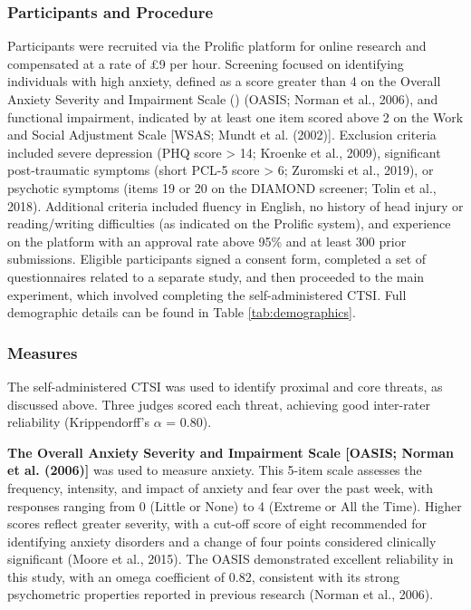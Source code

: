 \documentclass[
  man,floatsintext]{apa7}
\begin{document}
\subsubsection{Participants and Procedure}\label{participants-and-procedure-2}

Participants were recruited via the Prolific platform for online research and compensated at a rate of £9 per hour.
Screening focused on identifying individuals with high anxiety, defined as a score greater than 4 on the Overall Anxiety Severity and Impairment Scale () (OASIS; Norman et al., 2006), and functional impairment, indicated by at least one item scored above 2 on the Work and Social Adjustment Scale {[}WSAS; Mundt et al. (2002){]}.
Exclusion criteria included severe depression (PHQ score \textgreater{} 14; Kroenke et al., 2009), significant post-traumatic symptoms (short PCL-5 score \textgreater{} 6; Zuromski et al., 2019), or psychotic symptoms (items 19 or 20 on the DIAMOND screener; Tolin et al., 2018).
Additional criteria included fluency in English, no history of head injury or reading/writing difficulties (as indicated on the Prolific system), and experience on the platform with an approval rate above 95\% and at least 300 prior submissions.
Eligible participants signed a consent form, completed a set of questionnaires related to a separate study, and then proceeded to the main experiment, which involved completing the self-administered CTSI.
Full demographic details can be found in Table \ref{tab:demographics}.

\subsubsection{Measures}\label{measures-4}

The self-administered CTSI was used to identify proximal and core threats, as discussed above.
Three judges scored each threat, achieving good inter-rater reliability (Krippendorff's \(\alpha\) = 0.80).

\textbf{The Overall Anxiety Severity and Impairment Scale {[}OASIS; Norman et al. (2006){]}} was used to measure anxiety.
This 5-item scale assesses the frequency, intensity, and impact of anxiety and fear over the past week, with responses ranging from 0 (Little or None) to 4 (Extreme or All the Time).
Higher scores reflect greater severity, with a cut-off score of eight recommended for identifying anxiety disorders and a change of four points considered clinically significant (Moore et al., 2015).
The OASIS demonstrated excellent reliability in this study, with an omega coefficient of 0.82, consistent with its strong psychometric properties reported in previous research (Norman et al., 2006).
\end{document}
